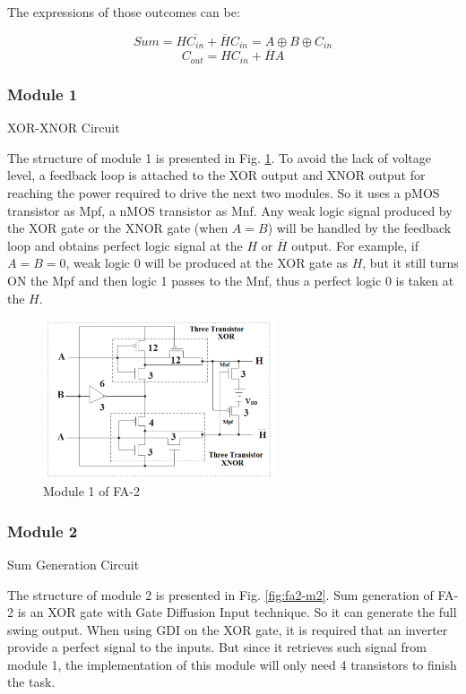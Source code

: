 \documentclass[conference]{IEEEtran}
\begin{document}
The expressions of those outcomes can be:

\[
	Sum = H\overline{C_{in}} + \overline{H}C_{in} = A \oplus B \oplus C_{in}
\]
\[
	C_{out} = HC_{in} + \overline{H}A
\]

\subsubsection{Module 1}XOR-XNOR Circuit

The structure of module 1 is presented in Fig. \ref{fig:fa2-m1}.
To avoid the lack of voltage level, a feedback loop is attached to the XOR output and XNOR output
for reaching the power required to drive the next two modules. So it uses a pMOS transistor as Mpf, a nMOS transistor as Mnf.
Any weak logic signal produced by the XOR gate or the XNOR gate (when \(A=B\))
will be handled by the feedback loop and obtains perfect logic signal at the \(H\) or $\overline{H}$ output.
For example, if \(A = B = 0\), weak logic 0 will be produced at the XOR gate as \(H\),
but it still turns ON the Mpf and then logic 1 passes to the Mnf, thus a perfect logic 0 is taken at the \(H\).

\begin{figure}[!ht]
	\centering
	\includegraphics[width=2.7in]{fa2-m1.png}
	\caption{Module 1 of FA-2}
	\label{fig:fa2-m1}
\end{figure}

\subsubsection{Module 2} Sum Generation Circuit

The structure of module 2 is presented in Fig. \ref{fig:fa2-m2}.
Sum generation of FA-2 is an XOR gate with Gate Diffusion Input technique.
So it can generate the full swing output.
When using GDI on the XOR gate, it is required that an inverter provide a perfect signal to the inputs.
But since it retrieves such signal from module 1, the implementation of this module will only need 4 transistors to finish the task.
\end{document}

